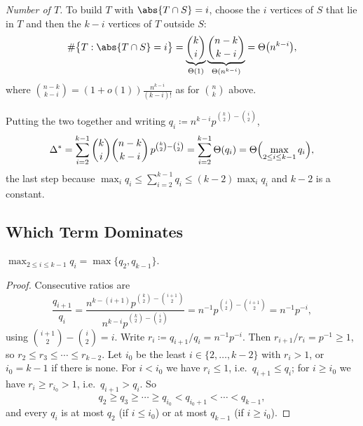\emph{Number of \(T\).} To build \(T\) with \(\abs{T \cap S} = i\), choose the \(i\) vertices of \(S\) that lie in \(T\) and then the \(k-i\) vertices of \(T\) outside \(S\):
\[
    \#\bigl\{ T : \abs{T \cap S} = i \bigr\}
    = \underbrace{\binom{k}{i}}_{\Theta(1)} \underbrace{\binom{n-k}{k-i}}_{\Theta(n^{k-i})}
    = \Theta\bigl( n^{k-i} \bigr),
\]
where \(\binom{n-k}{k-i} = (1+o(1))\frac{n^{k-i}}{(k-i)!}\) as for \(\binom{n}{k}\) above.

Putting the two together and writing \(q_i \coloneqq n^{k-i} p^{\binom{k}{2} - \binom{i}{2}}\),
\[
    \Delta^{*} = \sum_{i=2}^{k-1} \binom{k}{i}\binom{n-k}{k-i} \, p^{\binom{k}{2} - \binom{i}{2}}
    = \sum_{i=2}^{k-1} \Theta(q_i)
    = \Theta\Bigl( \max_{2 \le i \le k-1} q_i \Bigr),
\]
the last step because \(\max_i q_i \le \sum_{i=2}^{k-1} q_i \le (k-2) \max_i q_i\) and \(k - 2\) is a constant.

\subsection{Which Term Dominates}

\begin{lemma}\label{lem:qi-endpoints}
    \(\max_{2 \le i \le k-1} q_i = \max\{ q_2, q_{k-1} \}\).
\end{lemma}

\begin{proof}
    Consecutive ratios are
    \[
        \frac{q_{i+1}}{q_i}
        = \frac{n^{k-(i+1)} p^{\binom{k}{2} - \binom{i+1}{2}}}{n^{k-i} p^{\binom{k}{2} - \binom{i}{2}}}
        = n^{-1} p^{\binom{i}{2} - \binom{i+1}{2}}
        = n^{-1} p^{-i},
    \]
    using \(\binom{i+1}{2} - \binom{i}{2} = i\). Write \(r_i \coloneqq q_{i+1}/q_i = n^{-1}p^{-i}\). Then \(r_{i+1}/r_i = p^{-1} \ge 1\), so \(r_2 \le r_3 \le \cdots \le r_{k-2}\). Let \(i_0\) be the least \(i \in \{2, \ldots, k-2\}\) with \(r_i > 1\), or \(i_0 = k-1\) if there is none. For \(i < i_0\) we have \(r_i \le 1\), i.e.\ \(q_{i+1} \le q_i\); for \(i \ge i_0\) we have \(r_i \ge r_{i_0} > 1\), i.e.\ \(q_{i+1} > q_i\). So
    \[
        q_2 \ge q_3 \ge \cdots \ge q_{i_0} < q_{i_0+1} < \cdots < q_{k-1},
    \]
    and every \(q_i\) is at most \(q_2\) (if \(i \le i_0\)) or at most \(q_{k-1}\) (if \(i \ge i_0\)).
\end{proof}

